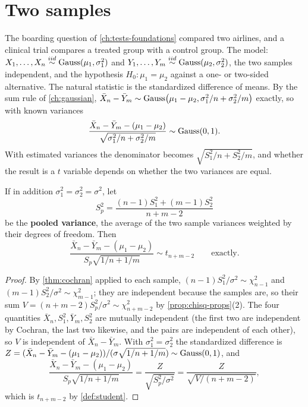 \section{Two samples}
\label{sec:t-two}

The boarding question of \cref{ch:tests-foundations} compared two airlines, and a clinical trial compares a treated group with a control group.
The model: $X_1, \ldots, X_n \stackrel{iid}{\sim} \text{Gauss}(\mu_1, \sigma_1^2)$ and $Y_1, \ldots, Y_m \stackrel{iid}{\sim} \text{Gauss}(\mu_2, \sigma_2^2)$, the two samples independent, and the hypothesis $H_0: \mu_1 = \mu_2$ against a one- or two-sided alternative.
The natural statistic is the standardized difference of means.
By the sum rule of \cref{ch:gaussian}, $\bar{X}_n - \bar{Y}_m \sim \text{Gauss}\big(\mu_1 - \mu_2, \sigma_1^2/n + \sigma_2^2/m\big)$ exactly, so with known variances
\[
\frac{\bar{X}_n - \bar{Y}_m - (\mu_1 - \mu_2)}{\sqrt{\sigma_1^2/n + \sigma_2^2/m}} \sim \text{Gauss}(0, 1).
\]
With estimated variances the denominator becomes $\sqrt{S_1^2/n + S_2^2/m}$, and whether the result is a $t$ variable depends on whether the two variances are equal.

\begin{theorem}
\label{thm:pooled-t}
If in addition $\sigma_1^2 = \sigma_2^2 = \sigma^2$, let
\[
S_p^2 = \frac{(n-1)S_1^2 + (m-1)S_2^2}{n + m - 2}
\]
be the \textbf{pooled variance}, the average of the two sample variances weighted by their degrees of freedom. Then
\[
\frac{\bar{X}_n - \bar{Y}_m - (\mu_1 - \mu_2)}{S_p\sqrt{1/n + 1/m}} \sim t_{n+m-2} \qquad \text{exactly}.
\]
\end{theorem}

\begin{proof}
By \cref{thm:cochran} applied to each sample, $(n-1)S_1^2/\sigma^2 \sim \chi^2_{n-1}$ and $(m-1)S_2^2/\sigma^2 \sim \chi^2_{m-1}$; they are independent because the samples are, so their sum $V = (n+m-2)S_p^2/\sigma^2 \sim \chi^2_{n+m-2}$ by \cref{prop:chisq-props}(2).
The four quantities $\bar{X}_n, S_1^2, \bar{Y}_m, S_2^2$ are mutually independent (the first two are independent by Cochran, the last two likewise, and the pairs are independent of each other), so $V$ is independent of $\bar{X}_n - \bar{Y}_m$.
With $\sigma_1^2 = \sigma_2^2$ the standardized difference is $Z = (\bar{X}_n - \bar{Y}_m - (\mu_1 - \mu_2))/(\sigma\sqrt{1/n + 1/m}) \sim \text{Gauss}(0,1)$, and
\[
\frac{\bar{X}_n - \bar{Y}_m - (\mu_1 - \mu_2)}{S_p\sqrt{1/n + 1/m}} = \frac{Z}{\sqrt{S_p^2/\sigma^2}} = \frac{Z}{\sqrt{V/(n+m-2)}},
\]
which is $t_{n+m-2}$ by \cref{def:student}.
\end{proof}

